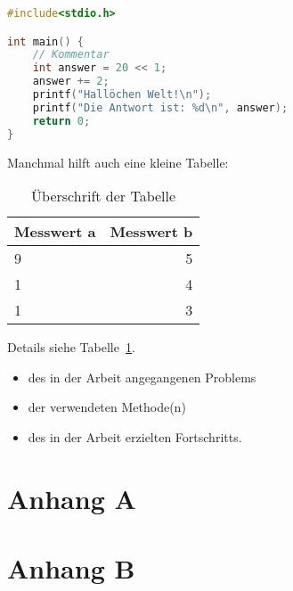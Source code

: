 \documentclass[oneside]{ausarbeitung}
\begin{document}
\begin{lstlisting}[language=c,%
                   caption={Überschrift des Quelltexts},label=lst:test]
#include<stdio.h>

int main() {
    // Kommentar
    int answer = 20 << 1;
    answer += 2;
    printf("Hallöchen Welt!\n");
    printf("Die Antwort ist: %d\n", answer);
    return 0;
}
\end{lstlisting}

Manchmal hilft auch eine kleine Tabelle:

\begin{table}[htbp]
\centering
\begin{tabular}{|l|r|}
\hline
\textbf{Messwert a} & \textbf{Messwert b} \\ \hline
9 & 5 \\ \hline
1 & 4 \\ \hline
1 & 3 \\ \hline
\end{tabular}
\caption{Überschrift der Tabelle}
\label{tab:my-table}
\end{table}

Details siehe Tabelle~\ref{tab:my-table}.


  \begin{itemize}
    \item des in der Arbeit angegangenen Problems
    \item der verwendeten Methode(n)
    \item des in der Arbeit erzielten Fortschritts.
  \end{itemize}

\appendix

\printbibliography[heading=bibintoc]

\chapter{Anhang A}

\Blindtext

\chapter{Anhang B}

\Blindtext
\end{document}
